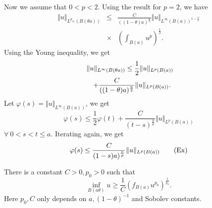 Now we assume that $ 0 < p < 2$. Using the result for $ p = 2$, we have 
\begin{eqnarray*}\Vert u \Vert _{L^{p_\infty} (B (\theta a  ))} &\leq &     \frac{C }{((1 - \theta ) a)^{\frac{n}{2}}} \Vert u \Vert _{L^{\infty} (B (a))^{1 - \frac{p}{2}}} \\
& \times &  \left( \int _{B(a)} u ^p \right) ^{\frac{1}{2}}.
\end{eqnarray*}
%
Using the Young inequality, we get 
%
\begin{eqnarray*}
\lefteqn{\Vert u \Vert _{L^{\infty} (B (\theta a  ))} \leq     \frac{1 }{2} \Vert u \Vert _{L^{p} (B (a))}}\\
&& + \frac{C }{((1 - \theta ) a)^{\frac{n}{2}}}  \Vert u \Vert _{L^{p} (B (a))}.
\end{eqnarray*}
%
Let $ \varphi (s) = \Vert u \Vert_{L^{\infty} (B (a))} $, we get 
%
\[ \varphi (s) \leq \frac{1}{2} \varphi (t) + \frac{C}{(t-s)^{\frac{n}{p}}} \Vert u \Vert _{L^{p} (B (a))}\]
%
$\forall \  0 < s < t \leq a $. Iterating again, we get 
%
\begin{equation} \varphi (s) \leq   \frac{C}{(1-s)a)^{\frac{n}{p}}} \Vert u \Vert _{L^{p} (B (a))} \tag{{\rm Ex}}\end{equation}
%
\begin{theorem} There is a constant $ C > 0 , p_0 > 0 $ such that
%
\[\inf_{B(a \theta)} u \geq \frac{1}{C} \left( f _{B(a)} u ^{p_{0}} \right) ^{\frac{1}{p_{0}}}.\]
%
Here $p_0, C $ only depends on $ a, (1 - \theta )^{-1} $ and Sobolev constants.
\end{theorem}

